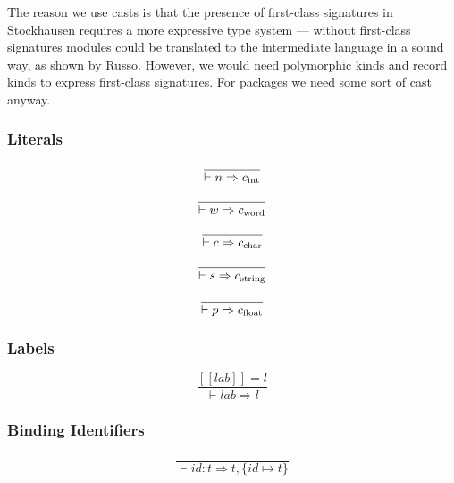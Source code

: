 \documentclass[twoside]{article}
\newcommand{\x}[1]{\mathit{#1}}
\newcommand{\f}[1]{\mbox{#1}}
\renewcommand{\c}[1]{c_{\f{\scriptsize #1}}}
\newcommand{\lab}{\x{lab}}
\newcommand{\id}{\x{id}}
\newcommand{\lit}{\x{lit}}
\begin{document}
The reason we use casts is that the presence of first-class signatures in Stockhausen requires a more expressive type system --- without first-class signatures modules could be translated to the intermediate language in a sound way, as shown by Russo. However, we would need polymorphic kinds and record kinds to express first-class signatures. For packages we need some sort of cast anyway.


\subsubsection*{Literals \hfill
\fbox{$\vdash \lit \Rightarrow t$}
}

\begin{equation}
\frac{}{
\vdash n \Rightarrow \c{int}
}
\end{equation}

\begin{equation}
\frac{}{
\vdash w \Rightarrow \c{word}
}
\end{equation}

\begin{equation}
\frac{}{
\vdash c \Rightarrow \c{char}
}
\end{equation}

\begin{equation}
\frac{}{
\vdash s \Rightarrow \c{string}
}
\end{equation}

\begin{equation}
\frac{}{
\vdash p \Rightarrow \c{float}
}
\end{equation}



\subsubsection*{Labels \hfill
\fbox{$\vdash \lab \Rightarrow l$}
}

\begin{equation}
\frac{
[\![\lab]\!] = l
}{
\vdash \lab \Rightarrow l
}
\end{equation}



\subsubsection*{Binding Identifiers \hfill
\fbox{$\vdash \id \Rightarrow t,E$}
}

\begin{equation}
\frac{}{
\vdash \id : t \Rightarrow t,\{\id \mapsto t\}
}
\end{equation}
\end{document}
